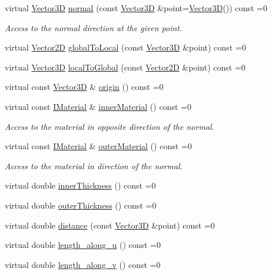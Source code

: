 \begin{DoxyCompactItemize}
\item 
virtual \hyperlink{class_d_d_surfaces_1_1_vector3_d}{Vector3D} \hyperlink{class_d_d_surfaces_1_1_i_surface_abbead4b1af2864d6d3f61270543310a0}{normal} (const \hyperlink{class_d_d_surfaces_1_1_vector3_d}{Vector3D} \&point=\hyperlink{class_d_d_surfaces_1_1_vector3_d}{Vector3D}()) const =0
\begin{DoxyCompactList}\small\item\em Access to the normal direction at the given point. \end{DoxyCompactList}\item 
virtual \hyperlink{class_d_d_surfaces_1_1_vector2_d}{Vector2D} \hyperlink{class_d_d_surfaces_1_1_i_surface_a0d6db86d4871584a9e72ac6018229737}{global\+To\+Local} (const \hyperlink{class_d_d_surfaces_1_1_vector3_d}{Vector3D} \&point) const =0
\item 
virtual \hyperlink{class_d_d_surfaces_1_1_vector3_d}{Vector3D} \hyperlink{class_d_d_surfaces_1_1_i_surface_a39651d79f7969ac7402a6e2cfc37803c}{local\+To\+Global} (const \hyperlink{class_d_d_surfaces_1_1_vector2_d}{Vector2D} \&point) const =0
\item 
virtual const \hyperlink{class_d_d_surfaces_1_1_vector3_d}{Vector3D} \& \hyperlink{class_d_d_surfaces_1_1_i_surface_a552cf76ca76154d0a6d9709d826b57f4}{origin} () const =0
\item 
virtual const \hyperlink{class_d_d_surfaces_1_1_i_material}{I\+Material} \& \hyperlink{class_d_d_surfaces_1_1_i_surface_a18942d2f0ea7478506765a50fa44d5e3}{inner\+Material} () const =0
\begin{DoxyCompactList}\small\item\em Access to the material in opposite direction of the normal. \end{DoxyCompactList}\item 
virtual const \hyperlink{class_d_d_surfaces_1_1_i_material}{I\+Material} \& \hyperlink{class_d_d_surfaces_1_1_i_surface_a49dfd8a5eef419226abc675b8d1126a5}{outer\+Material} () const =0
\begin{DoxyCompactList}\small\item\em Access to the material in direction of the normal. \end{DoxyCompactList}\item 
virtual double \hyperlink{class_d_d_surfaces_1_1_i_surface_ab6913582dd6c1f44df2038705ce2aea6}{inner\+Thickness} () const =0
\item 
virtual double \hyperlink{class_d_d_surfaces_1_1_i_surface_aa2559a8904e474835c5d24c243a44909}{outer\+Thickness} () const =0
\item 
virtual double \hyperlink{class_d_d_surfaces_1_1_i_surface_a430ebd157354388b50218dfb356a9ca1}{distance} (const \hyperlink{class_d_d_surfaces_1_1_vector3_d}{Vector3D} \&point) const =0
\item 
virtual double \hyperlink{class_d_d_surfaces_1_1_i_surface_a0060710912d3447e296a8e0875690cc9}{length\+\_\+along\+\_\+u} () const =0
\item 
virtual double \hyperlink{class_d_d_surfaces_1_1_i_surface_a9a4682bfa68557d53cfd319cfa54148d}{length\+\_\+along\+\_\+v} () const =0
\end{DoxyCompactItemize}


